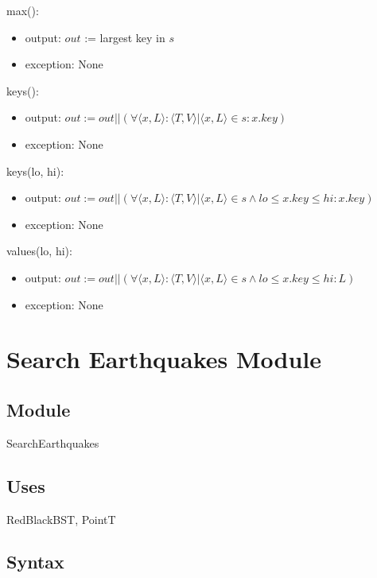 \documentclass[12pt]{article}
\begin{document}
\noindent max():
\begin{itemize}
\item output: $out$ := largest key in $s$
\item exception: None
\end{itemize}

\noindent keys():
\begin{itemize}
\item output: $out := out || (\forall \langle x, L \rangle : \langle T, V \rangle | \langle x, L \rangle \in s : x.key)$
\item exception: None
\end{itemize}

\noindent keys(lo, hi):
\begin{itemize}
\item output: $out := out || (\forall \langle x, L \rangle : \langle T, V \rangle | \langle x, L \rangle \in s \wedge
lo \le x.key \le hi : x.key)$
\item exception: None
\end{itemize}

\noindent values(lo, hi):
\begin{itemize}
\item output: $out := out || (\forall \langle x, L \rangle : \langle T, V \rangle | \langle x, L \rangle \in s \wedge
lo \le x.key \le hi : L)$
\item exception: None
\end{itemize}



\newpage

\section* {Search Earthquakes Module}

\subsection* {Module}

SearchEarthquakes

\subsection* {Uses}

RedBlackBST, PointT

\subsection* {Syntax}
\end{document}
